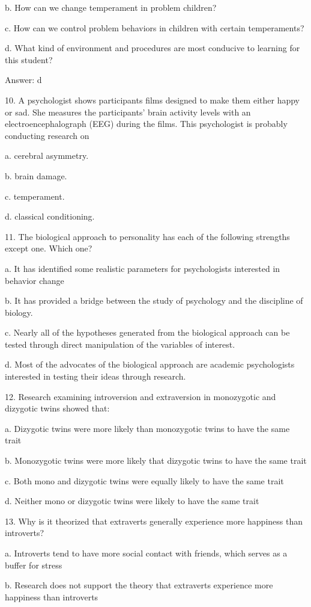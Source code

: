\documentclass{article}
\begin{document}
b. How can we change temperament in problem children?

c. How can we control problem behaviors in children with certain temperaments?

d. What kind of environment and procedures are most conducive to learning for this student?

Answer: d

10. A psychologist shows participants films designed to make them either happy or sad. She measures the participants' brain activity levels with an electroencephalograph (EEG) during the films. This psychologist is probably conducting research on

a. cerebral asymmetry.

b. brain damage.

c. temperament.

d. classical conditioning.

11. The biological approach to personality has each of the following strengths except one. Which one?

a. It has identified some realistic parameters for psychologists interested in behavior change

b. It has provided a bridge between the study of psychology and the discipline of biology.

c. Nearly all of the hypotheses generated from the biological approach can be tested through direct manipulation of the variables of interest.

d. Most of the advocates of the biological approach are academic psychologists interested in testing their ideas through research.

12. Research examining introversion and extraversion in monozygotic and dizygotic twins showed that:

a. Dizygotic twins were more likely than monozygotic twins to have the same trait

b. Monozygotic twins were more likely that dizygotic twins to have the same trait

c. Both mono and dizygotic twins were equally likely to have the same trait

d. Neither mono or dizygotic twins were likely to have the same trait

13. Why is it theorized that extraverts generally experience more happiness than introverts?

a. Introverts tend to have more social contact with friends, which serves as a buffer for stress

b. Research does not support the theory that extraverts experience more happiness than introverts
\end{document}
